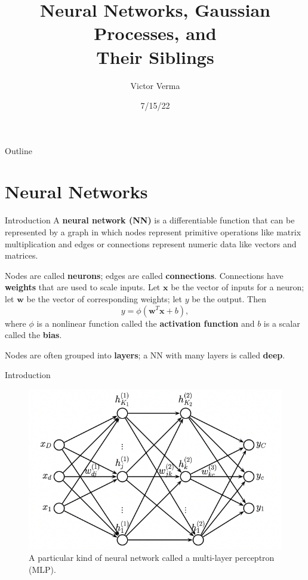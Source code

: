 \documentclass{beamer}
\title[NNs, GPs, and Their Siblings]{
Neural Networks, Gaussian Processes, and \\
Their Siblings
}
\author[Victor Verma]{Victor Verma}
\institute[]{Hot Ideas in Machine Learning Reading Group, University of Michigan}
\date{7/15/22}
\begin{document}
\begin{frame}
  \titlepage
\end{frame}

\begin{frame}{Outline}
    \tableofcontents
\end{frame}

\section{Neural Networks}

\begin{frame}{Introduction}
    A \textbf{neural network (NN)} is a differentiable function that can be represented by a graph in which nodes represent primitive operations like matrix multiplication and edges or connections represent numeric data like vectors and matrices.
    
    \medskip
    
    Nodes are called \textbf{neurons}; edges are called \textbf{connections}. Connections have \textbf{weights} that are used to scale inputs. Let $\boldsymbol{x}$ be the vector of inputs for a neuron; let $\boldsymbol{w}$ be the vector of corresponding weights; let $y$ be the output. Then
    \[
    y = \phi(\boldsymbol{w}^T \boldsymbol{x} + b),
    \]
    where $\phi$ is a nonlinear function called the \textbf{activation function} and $b$ is a scalar called the \textbf{bias}.
    
    \medskip
    
    Nodes are often grouped into \textbf{layers}; a NN with many layers is called \textbf{deep}.
\end{frame}

\begin{frame}{Introduction}
    \begin{figure}
        \centering
        \includegraphics[scale=0.8]{mlp.png}
        \caption{A particular kind of neural network called a multi-layer perceptron (MLP).}
        \label{fig:mlp}
    \end{figure}    
\end{frame}
\end{document}
